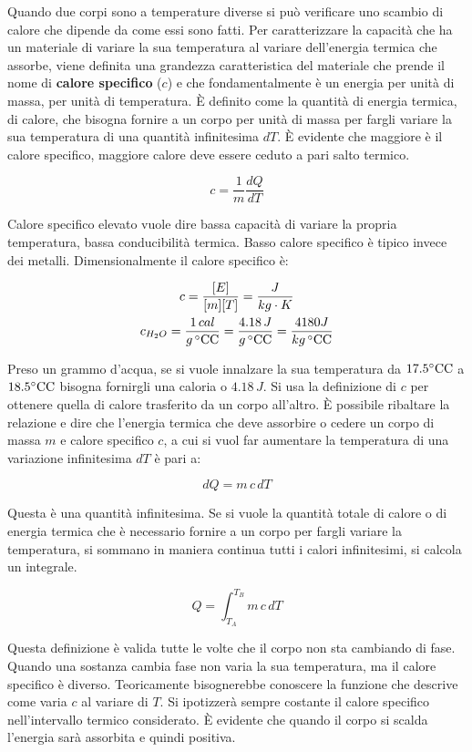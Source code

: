 Quando due corpi sono a temperature diverse si può verificare uno scambio di calore che dipende da come essi sono fatti. Per caratterizzare la capacità che ha un materiale di variare la sua temperatura al variare dell'energia termica che assorbe, viene definita una grandezza caratteristica del materiale che prende il nome di \textbf{calore specifico} ($c$) e che fondamentalmente è un energia per unità di massa, per unità di temperatura. È definito come la quantità di energia termica, di calore, che bisogna fornire a un corpo per unità di massa per fargli variare la sua temperatura di una quantità infinitesima $dT$. È evidente che maggiore è il calore specifico, maggiore calore deve essere ceduto a pari salto termico.

\[
	c = \frac{1}{m} \frac{dQ}{dT}
\]

Calore specifico elevato vuole dire bassa capacità di variare la propria temperatura, bassa conducibilità termica. Basso calore specifico è tipico invece dei metalli. Dimensionalmente il calore specifico è:

\begin{gather*}
	c = \frac{[E]}{[m][T]} = \frac{J}{kg\cdot K} \\
	c_{H_2 O} = \frac{1\,cal }{g\, ^\circ\text{C} \text{C} } = \frac{4.18 \, J}{g\, ^\circ\text{C} \text{C}} = \frac{4180J}{kg\, ^\circ\text{C} \text{C}}
\end{gather*}

Preso un grammo d'acqua, se si vuole innalzare la sua temperatura da $17.5 ^\circ\text{C} \text{C}$ a $18.5 ^\circ\text{C} \text{C}$ bisogna fornirgli una caloria o $4.18 \, J$.
Si usa la definizione di $c$ per ottenere quella di calore trasferito da un corpo all'altro. È possibile ribaltare la relazione e dire che l'energia termica che deve assorbire o cedere un corpo di massa $m$ e calore specifico $c$, a cui si vuol far aumentare la temperatura di una variazione infinitesima $dT$ è pari a:

\[
	dQ = m\,c\,dT
\]

Questa è una quantità infinitesima. Se si vuole la quantità totale di calore o di energia termica che è necessario fornire a un corpo per fargli variare la temperatura, si sommano in maniera continua tutti i calori infinitesimi, si calcola un integrale.

\[
	Q = \int_{T_A}^{T_B} m\,c\,dT
\]

Questa definizione è valida tutte le volte che il corpo non sta cambiando di fase. Quando una sostanza cambia fase non varia la sua temperatura, ma il calore specifico è diverso. Teoricamente bisognerebbe conoscere la funzione che descrive come varia $c$ al variare di $T$. Si ipotizzerà sempre costante il calore specifico nell'intervallo termico considerato. È evidente che quando il corpo si scalda l'energia sarà assorbita e quindi positiva.

